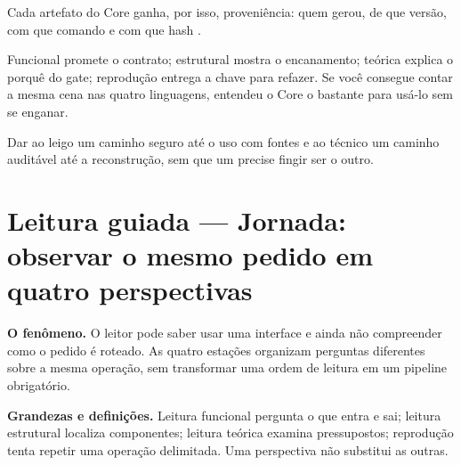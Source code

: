 Cada artefato do Core ganha, por isso, proveni\^encia: quem gerou, de que vers\~ao, com que comando e com que hash .


\begin{descricao}
Funcional promete o contrato; estrutural mostra o encanamento; te\'orica explica o porqu\^e do gate; reprodu\c{c}\~ao entrega a chave para refazer. Se voc\^e consegue contar a mesma cena nas quatro linguagens, entendeu o Core o bastante para us\'a-lo sem se enganar.
\end{descricao}

\begin{funcao}
Dar ao leigo um caminho seguro at\'e o uso com fontes e ao t\'ecnico um caminho audit\'avel at\'e a reconstru\c{c}\~ao, sem que um precise fingir ser o outro.
\end{funcao}


\section[Leitura guiada]{Leitura guiada — Jornada: observar o mesmo pedido em quatro perspectivas}
\begin{descricao}
\textbf{O fenômeno.} O leitor pode saber usar uma interface e ainda não compreender como o pedido é roteado. As quatro estações organizam perguntas diferentes sobre a mesma operação, sem transformar uma ordem de leitura em um pipeline obrigatório.
\end{descricao}

\begin{definicao}
\textbf{Grandezas e definições.} Leitura funcional pergunta o que entra e sai; leitura estrutural localiza componentes; leitura teórica examina pressupostos; reprodução tenta repetir uma operação delimitada. Uma perspectiva não substitui as outras.
\end{definicao}

